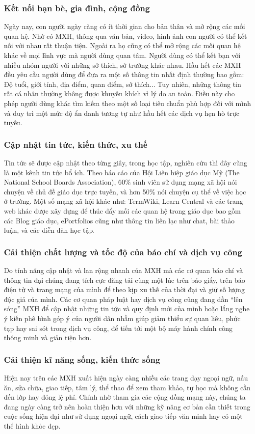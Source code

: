 		\subsubsection{Kết nối bạn bè, gia đình, cộng đồng}
		Ngày nay, con người ngày càng có ít thời gian cho bản thân và mở rộng các mối quan hệ. Nhờ có MXH, thông qua văn bản, video, hình ảnh con người có thể kết nối với nhau rất thuận tiện. Ngoài ra họ cũng có thể mở rộng các mối quan hệ khác về mọi lĩnh vực mà người dùng quan tâm. Người dùng có thể kết bạn với nhiều nhóm người với những sở thích, sở trường khác nhau. Hầu hết các MXH đều yêu cầu người dùng để đưa ra một số thông tin nhất định thường bao gồm: Độ tuổi, giới tính, địa điểm, quan điểm, sở thích... Tuy nhiên, những thông tin rất cá nhân thường không được khuyến khích vì lý do an toàn. Điều này cho phép người dùng khác tìm kiếm theo một số loại tiêu chuẩn phù hợp đối với mình và duy trì một mức độ ẩn danh tương tự như hầu hết các dịch vụ hẹn hò trực tuyến.
		\subsubsection{Cập nhật tin tức, kiến thức, xu thế}
		Tin tức sẽ được cập nhật theo từng giây, trong học tập, nghiên cứu thì đây cũng là một kênh tin tức bổ ích. Theo báo cáo của Hội Liên hiệp giáo dục Mỹ (The National School Boards Association), 60\% sinh viên sử dụng mạng xã hội nói chuyện về chủ đề giáo dục trực tuyến, và hơn 50\% nói chuyện cụ thể về việc học ở trường. Một số mạng xã hội khác như: TermWiki, Learn Central và các trang web khác được xây dựng để thúc đẩy mối các quan hệ trong giáo dục bao gồm các Blog giáo dục, ePortfolios cũng như thông tin liên lạc như chat, bài thảo luận, và các diễn đàn học tập.
		\subsubsection{Cải thiện chất lượng và tốc độ của báo chí và dịch vụ công}
		Do tính năng cập nhật và lan rộng nhanh của MXH mà các cơ quan báo chí và thông tin đại chúng đang tích cực đăng tải cùng một lúc trên báo giấy, trên báo điện tử và trang mạng của mình để theo kịp xu thế của thời đại và giữ số lượng độc giả của mình. Các cơ quan pháp luật hay dịch vụ công cũng đang dần “lên sóng” MXH để cập nhật những tin tức và quy định mới của mình hoặc lắng nghe ý kiến phê bình góp ý của người dân nhằm giúp giảm thiểu sự quan liêu, phức tạp hay sai sót trong dịch vụ công, để tiến tới một bộ máy hành chính công thông minh và giản tiện hơn.
		\subsubsection{Cải thiện kĩ năng sống, kiến thức sống}
		Hiện nay trên các MXH xuất hiện ngày càng nhiều các trang dạy ngoại ngữ, nấu ăn, sửa chữa, giao tiếp, tâm lý, thể thao để xem tham khảo, tự học mà không cần đến lớp hay đóng lệ phí. Chính nhờ tham gia các cộng đồng mạng này, chúng ta đang ngày càng trở nên hoàn thiện hơn với những kỹ năng cơ bản cần thiết trong cuộc sống hiện đại như sử dụng ngoại ngữ, cách giao tiếp văn minh hay có một thể hình khỏe đẹp.
